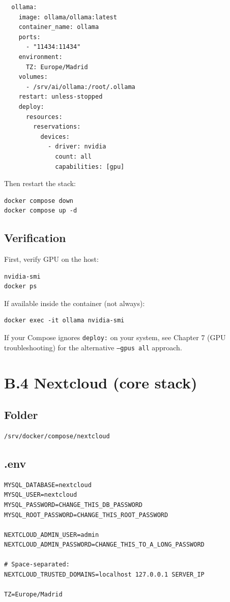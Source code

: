 \begin{lstlisting}
  ollama:
    image: ollama/ollama:latest
    container_name: ollama
    ports:
      - "11434:11434"
    environment:
      TZ: Europe/Madrid
    volumes:
      - /srv/ai/ollama:/root/.ollama
    restart: unless-stopped
    deploy:
      resources:
        reservations:
          devices:
            - driver: nvidia
              count: all
              capabilities: [gpu]
\end{lstlisting}

Then restart the stack:
\begin{lstlisting}
docker compose down
docker compose up -d
\end{lstlisting}

\subsection*{Verification}
First, verify GPU on the host:
\begin{lstlisting}
nvidia-smi
docker ps
\end{lstlisting}

If available inside the container (not always):
\begin{lstlisting}
docker exec -it ollama nvidia-smi
\end{lstlisting}

If your Compose ignores \texttt{deploy:} on your system, see Chapter 7 (GPU troubleshooting) for the alternative \texttt{--gpus all} approach.

\section{B.4 Nextcloud (core stack)}
\subsection*{Folder}
\begin{lstlisting}
/srv/docker/compose/nextcloud
\end{lstlisting}

\subsection*{.env}
\begin{lstlisting}
MYSQL_DATABASE=nextcloud
MYSQL_USER=nextcloud
MYSQL_PASSWORD=CHANGE_THIS_DB_PASSWORD
MYSQL_ROOT_PASSWORD=CHANGE_THIS_ROOT_PASSWORD

NEXTCLOUD_ADMIN_USER=admin
NEXTCLOUD_ADMIN_PASSWORD=CHANGE_THIS_TO_A_LONG_PASSWORD

# Space-separated:
NEXTCLOUD_TRUSTED_DOMAINS=localhost 127.0.0.1 SERVER_IP

TZ=Europe/Madrid
\end{lstlisting}

